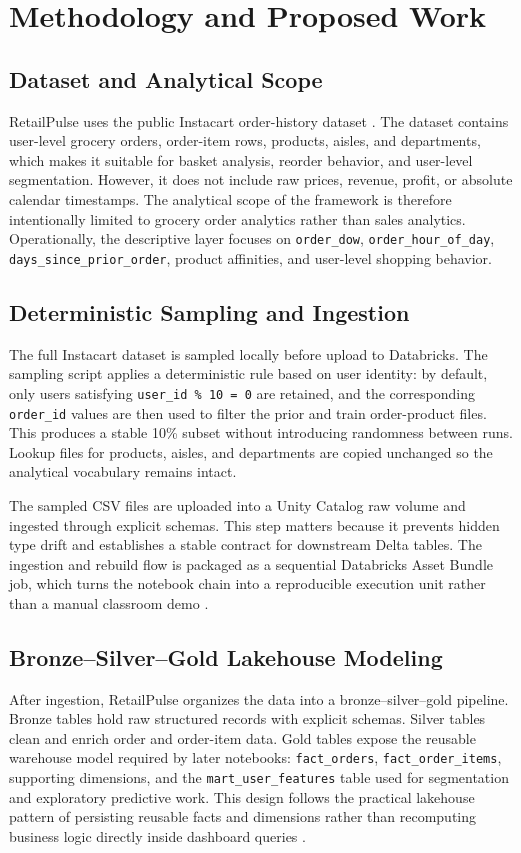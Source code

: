 \documentclass[journal]{IEEEtran}
\begin{document}
\section{Methodology and Proposed Work}
\subsection{Dataset and Analytical Scope}
RetailPulse uses the public Instacart order-history dataset \cite{instacart_dataset}. The dataset contains user-level grocery orders, order-item rows, products, aisles, and departments, which makes it suitable for basket analysis, reorder behavior, and user-level segmentation. However, it does not include raw prices, revenue, profit, or absolute calendar timestamps. The analytical scope of the framework is therefore intentionally limited to grocery order analytics rather than sales analytics. Operationally, the descriptive layer focuses on \texttt{order\_dow}, \texttt{order\_hour\_of\_day}, \texttt{days\_since\_prior\_order}, product affinities, and user-level shopping behavior.

\subsection{Deterministic Sampling and Ingestion}
The full Instacart dataset is sampled locally before upload to Databricks. The sampling script applies a deterministic rule based on user identity: by default, only users satisfying \texttt{user\_id \% 10 = 0} are retained, and the corresponding \texttt{order\_id} values are then used to filter the prior and train order-product files. This produces a stable 10\% subset without introducing randomness between runs. Lookup files for products, aisles, and departments are copied unchanged so the analytical vocabulary remains intact.

The sampled CSV files are uploaded into a Unity Catalog raw volume and ingested through explicit schemas. This step matters because it prevents hidden type drift and establishes a stable contract for downstream Delta tables. The ingestion and rebuild flow is packaged as a sequential Databricks Asset Bundle job, which turns the notebook chain into a reproducible execution unit rather than a manual classroom demo \cite{databricks_bundles}.

\subsection{Bronze--Silver--Gold Lakehouse Modeling}
After ingestion, RetailPulse organizes the data into a bronze--silver--gold pipeline. Bronze tables hold raw structured records with explicit schemas. Silver tables clean and enrich order and order-item data. Gold tables expose the reusable warehouse model required by later notebooks: \texttt{fact\_orders}, \texttt{fact\_order\_items}, supporting dimensions, and the \texttt{mart\_user\_features} table used for segmentation and exploratory predictive work. This design follows the practical lakehouse pattern of persisting reusable facts and dimensions rather than recomputing business logic directly inside dashboard queries \cite{armbrust2020deltalake,zaharia2021lakehouse}.
\end{document}
